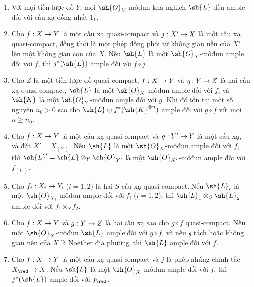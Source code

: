 \documentclass[oneside,10pt]{amsart}
\makeatletter
\renewcommand{\geq}{\geqslant}
\newcommand{\ega@arrow}[2]{\mathchoice{#1}{#2}{#2}{#2}}
\renewcommand{\to}{\ega@arrow{\longrightarrow}{\rightarrow}}
\newcommand{\oldpage}[2][]{\marginnote{\normalfont\footnotesize\textbf{#1}~|~#2}\ignorespaces}
\let\EGAOriginalLabel\label
\renewcommand{\label}[1]{\phantomsection\EGAOriginalLabel{#1}}
\makeatother
\begin{document}
\begin{proposition}[4.6.13]
\label{II.4.6.13}
\begin{enumerate}
  \item[\rm{(i)}] Với mọi tiền lược đồ $Y$, mọi $\sh{O}_Y$-môđun khả nghịch $\sh{L}$ đều ample đối với cấu xạ đồng nhất $1_Y$.
  \item[\rm{(i \emph{bis})}] Cho $f:X\to Y$ là một cấu xạ quasi-compact và $j:X'\to X$ là một cấu xạ quasi-compact, đồng thời là một phép đồng phôi từ không gian nền của $X'$ lên một không gian con của $X$.
    Nếu $\sh{L}$ là một $\sh{O}_X$-môđun ample đối với $f$, thì $j^*(\sh{L})$ ample đối với $f\circ j$.
  \item[\rm{(ii)}] Cho $Z$ là một tiền lược đồ quasi-compact, $f:X\to Y$ và $g:Y\to Z$ là hai cấu xạ quasi-compact, $\sh{L}$ là một $\sh{O}_X$-môđun ample đối với $f$, và $\sh{K}$ là một $\sh{O}_Y$-môđun ample đối với $g$.
    Khi đó tồn tại một số nguyên $n_0>0$ sao cho $\sh{L}\otimes f^*(\sh{K}^{\otimes n})$ ample đối với $g\circ f$ với mọi $n\geq n_0$.
  \item[\rm{(iii)}] Cho $f:X\to Y$ là một cấu xạ quasi-compact và $g:Y'\to Y$ là một cấu xạ, và đặt $X'=X_{(Y')}$.
    Nếu $\sh{L}$ là một $\sh{O}_X$-môđun ample đối với $f$, thì $\sh{L}'=\sh{L}\otimes_Y\sh{O}_{Y'}$ là một $\sh{O}_{X'}$-môđun ample đối với $f_{(Y')}$.
  \item[\rm{(iv)}] Cho $f_i:X_i\to Y_i$ ($i=1,2$) là hai $S$-cấu xạ quasi-compact.
    Nếu $\sh{L}_i$ là một $\sh{O}_{X_i}$-môđun ample đối với $f_i$ ($i=1,2$), thì $\sh{L}_1\otimes_S\sh{L}_2$ ample đối với $f_1\times_S f_2$.
  \item[\rm{(v)}] Cho $f:X\to Y$ và $g:Y\to Z$ là hai cấu xạ sao cho $g\circ f$ quasi-compact.
    Nếu một
\oldpage[II]{92}
    $\sh{O}_X$-môđun $\sh{L}$ ample đối với $g\circ f$, và nếu $g$ tách hoặc không gian nền của $X$ là Noether địa phương, thì $\sh{L}$ ample đối với $f$.
  \item[\rm{(vi)}] Cho $f:X\to Y$ là một cấu xạ quasi-compact và $j$ là phép nhúng chính tắc $X_\red\to X$.
    Nếu $\sh{L}$ là một $\sh{O}_X$-môđun ample đối với $f$, thì $j^*(\sh{L})$ ample đối với $f_\red$.
\end{enumerate}
\end{proposition}
\end{document}

